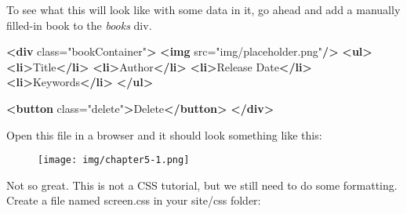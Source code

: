 \documentclass[9pt]{book}
\newenvironment{Shaded}{}{}
\newcommand{\KeywordTok}[1]{\textcolor[rgb]{0.00,0.44,0.13}{\textbf{{#1}}}}
\newcommand{\StringTok}[1]{\textcolor[rgb]{0.25,0.44,0.63}{{#1}}}
\newcommand{\OtherTok}[1]{\textcolor[rgb]{0.00,0.44,0.13}{{#1}}}
\newcommand{\NormalTok}[1]{{#1}}
\begin{document}
To see what this will look like with some data in it, go ahead and add a
manually filled-in book to the \emph{books} div.

\begin{Shaded}
\begin{Highlighting}[]
\KeywordTok{<div}\OtherTok{ class=}\StringTok{"bookContainer"}\KeywordTok{>}
    \KeywordTok{<img}\OtherTok{ src=}\StringTok{"img/placeholder.png"}\KeywordTok{/>}
    \KeywordTok{<ul>}
        \KeywordTok{<li>}\NormalTok{Title}\KeywordTok{</li>}
        \KeywordTok{<li>}\NormalTok{Author}\KeywordTok{</li>}
        \KeywordTok{<li>}\NormalTok{Release Date}\KeywordTok{</li>}
        \KeywordTok{<li>}\NormalTok{Keywords}\KeywordTok{</li>}
    \KeywordTok{</ul>}

    \KeywordTok{<button}\OtherTok{ class=}\StringTok{"delete"}\KeywordTok{>}\NormalTok{Delete}\KeywordTok{</button>}
\KeywordTok{</div>}
\end{Highlighting}
\end{Shaded}

Open this file in a browser and it should look something like this:

\begin{figure}[htbp]
\centering
\texttt{[image: img/chapter5-1.png]}
\end{figure}

Not so great. This is not a CSS tutorial, but we still need to do some
formatting. Create a file named screen.css in your site/css folder:
\end{document}
